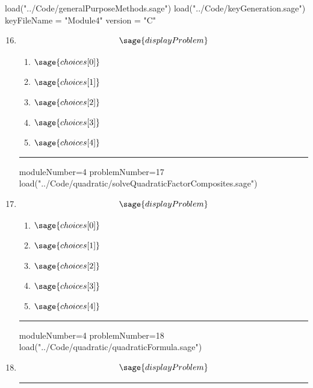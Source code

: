 \documentclass[14pt]{article}
\newcommand{\litem}[1]{\item#1\hspace*{-1cm}\rule{\textwidth}{0.4pt}}
\begin{document}
\pagestyle{fancy}

\begin{sagesilent}
load("../Code/generalPurposeMethods.sage")
load("../Code/keyGeneration.sage")
keyFileName = "Module4"
version = "C"
\end{sagesilent}

\begin{enumerate}
\setcounter{enumi}{15}


\begin{sagesilent}
moduleNumber=4
problemNumber=16
load("../Code/quadratic/factorLeadingOver1Composite.sage")
\end{sagesilent}

\litem{ 

  	\[ \sage{displayProblem} \]

	\begin{enumerate}[label=\Alph*.]
    \item \( \sage{choices[0]} \)
    \item \( \sage{choices[1]} \)
    \item \( \sage{choices[2]} \)
    \item \( \sage{choices[3]} \)
    \item \( \sage{choices[4]} \)
	\end{enumerate}

}

\begin{sagesilent}
moduleNumber=4
problemNumber=17
load("../Code/quadratic/solveQuadraticFactorComposites.sage")
\end{sagesilent}

\litem{ 

	\[ \sage{displayProblem} \]

	\begin{enumerate}[label=\Alph*.]
    \item \( \sage{choices[0]} \)
    \item \( \sage{choices[1]} \)
    \item \( \sage{choices[2]} \)
    \item \( \sage{choices[3]} \)
    \item \( \sage{choices[4]} \)
	\end{enumerate}
}

\begin{sagesilent}
moduleNumber=4
problemNumber=18
load("../Code/quadratic/quadraticFormula.sage")
\end{sagesilent}

\litem{ 
	\[ \sage{displayProblem} \]

}
\end{enumerate}
\end{document}
